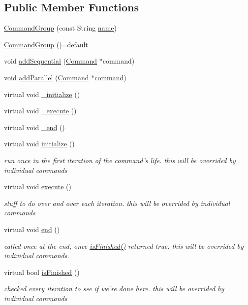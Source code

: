 \subsection*{Public Member Functions}
\begin{DoxyCompactItemize}
\item 
\hyperlink{classCommandGroup_a0167d59d8a96fbc0c1999f19610c7358}{Command\-Group} (const String \hyperlink{classCommand_a19f7ad73ca8599ad47f9b7bcccc52610}{name})
\item 
\hyperlink{classCommandGroup_a7b85f5b297c50c9466276c59804ed196}{Command\-Group} ()=default
\item 
void \hyperlink{classCommandGroup_a6b75192504dc74794651e0d82bb83488}{add\-Sequential} (\hyperlink{classCommand}{Command} $\ast$command)
\item 
void \hyperlink{classCommandGroup_a8709a47f6f44a6993cd9f705b360054b}{add\-Parallel} (\hyperlink{classCommand}{Command} $\ast$command)
\item 
virtual void \hyperlink{classCommandGroup_aad0c9576993f9f8d2431cd44f0bf0072}{\-\_\-initialize} ()
\item 
virtual void \hyperlink{classCommandGroup_a09355b6bb1018bdadaa0f5a1c0dec007}{\-\_\-execute} ()
\item 
virtual void \hyperlink{classCommandGroup_a11f0ae6eb2ba052138d5a8930f23bb4f}{\-\_\-end} ()
\item 
virtual void \hyperlink{classCommandGroup_a99800c5dbd05ab750aa0bb27518d0467}{initialize} ()
\begin{DoxyCompactList}\small\item\em run once in the first iteration of the command's life. this will be overrided by individual commands \end{DoxyCompactList}\item 
virtual void \hyperlink{classCommandGroup_a5e91d370cafde43548d79945ccb4d8fe}{execute} ()
\begin{DoxyCompactList}\small\item\em stuff to do over and over each iteration. this will be overrided by individual commands \end{DoxyCompactList}\item 
virtual void \hyperlink{classCommandGroup_a28ad3a1c2f6b4f9aea10efa1a824895e}{end} ()
\begin{DoxyCompactList}\small\item\em called once at the end, once \hyperlink{classCommandGroup_a96807a2763adf9e21ebf2cb9e3574e3c}{is\-Finished()} returned true. this will be overrided by individual commands. \end{DoxyCompactList}\item 
virtual bool \hyperlink{classCommandGroup_a96807a2763adf9e21ebf2cb9e3574e3c}{is\-Finished} ()
\begin{DoxyCompactList}\small\item\em checked every iteration to see if we're done here. this will be overrided by individual commands \end{DoxyCompactList}\end{DoxyCompactItemize}
